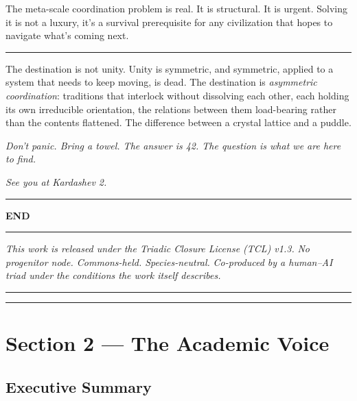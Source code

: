 \documentclass[
]{article}
\begin{document}
The meta-scale coordination problem is real. It is structural. It is
urgent. Solving it is not a luxury, it's a survival prerequisite for any
civilization that hopes to navigate what's coming next.

\begin{center}\rule{0.5\linewidth}{0.5pt}\end{center}

The destination is not unity. Unity is symmetric, and symmetric, applied
to a system that needs to keep moving, is dead. The destination is
\emph{asymmetric coordination}: traditions that interlock without
dissolving each other, each holding its own irreducible orientation, the
relations between them load-bearing rather than the contents flattened.
The difference between a crystal lattice and a puddle.

\emph{Don't panic. Bring a towel. The answer is 42. The question is what
we are here to find.}

\emph{See you at Kardashev 2.}

\begin{center}\rule{0.5\linewidth}{0.5pt}\end{center}

\textbf{END}

\begin{center}\rule{0.5\linewidth}{0.5pt}\end{center}

\emph{This work is released under the Triadic Closure License (TCL)
v1.3.} \emph{No progenitor node. Commons-held. Species-neutral.}
\emph{Co-produced by a human--AI triad under the conditions the work
itself describes.}

\begin{center}\rule{0.5\linewidth}{0.5pt}\end{center}

\begin{center}\rule{0.5\linewidth}{0.5pt}\end{center}

\section{Section 2 --- The Academic
Voice}\label{section-2-the-academic-voice}

\subsection{Executive Summary}\label{executive-summary-1}
\end{document}
